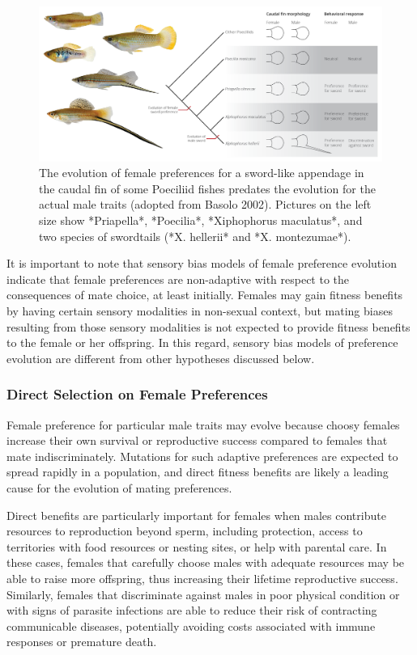\documentclass[
]{book}
\begin{document}
\begin{figure}
\includegraphics[width=1\linewidth]{images/sensorybias} \caption{The evolution of female preferences for a sword-like appendage in the caudal fin of some Poeciliid fishes predates the evolution for the actual male traits (adopted from Basolo 2002). Pictures on the left size show *Priapella*, *Poecilia*, *Xiphophorus maculatus*, and two species of swordtails (*X. hellerii* and *X. montezumae*).}\label{fig:sensorybias}
\end{figure}

It is important to note that sensory bias models of female preference evolution indicate that female preferences are non-adaptive with respect to the consequences of mate choice, at least initially. Females may gain fitness benefits by having certain sensory modalities in non-sexual context, but mating biases resulting from those sensory modalities is not expected to provide fitness benefits to the female or her offspring. In this regard, sensory bias models of preference evolution are different from other hypotheses discussed below.

\hypertarget{direct-selection-on-female-preferences}{%
\subsubsection*{Direct Selection on Female Preferences}\label{direct-selection-on-female-preferences}}

Female preference for particular male traits may evolve because choosy females increase their own survival or reproductive success compared to females that mate indiscriminately. Mutations for such adaptive preferences are expected to spread rapidly in a population, and direct fitness benefits are likely a leading cause for the evolution of mating preferences.

Direct benefits are particularly important for females when males contribute resources to reproduction beyond sperm, including protection, access to territories with food resources or nesting sites, or help with parental care. In these cases, females that carefully choose males with adequate resources may be able to raise more offspring, thus increasing their lifetime reproductive success. Similarly, females that discriminate against males in poor physical condition or with signs of parasite infections are able to reduce their risk of contracting communicable diseases, potentially avoiding costs associated with immune responses or premature death.
\end{document}
